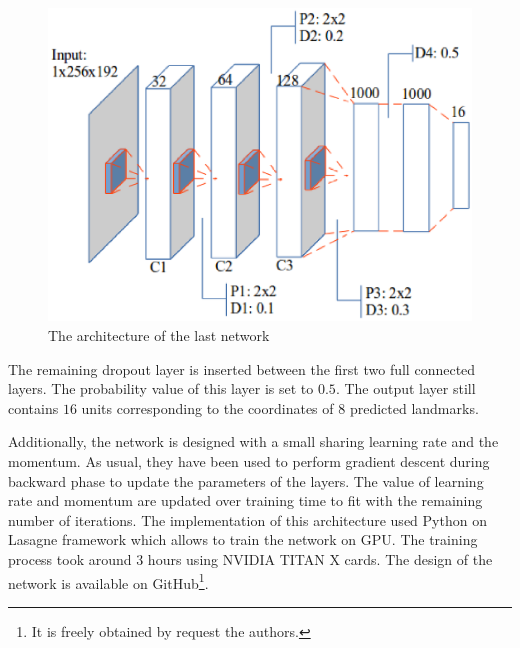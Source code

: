 \documentclass[conference]{IEEEtran}
\begin{document}
\begin{figure}[htbp]
	\centerline{\includegraphics[scale=0.45]{images/architecture3.eps}}
	\caption{The architecture of the last network}
	\label{figarch}
\end{figure}

The remaining dropout layer is inserted between the first two full connected layers. The probability value of this layer is set to $0.5$. The output layer still contains $16$ units corresponding to the coordinates of $8$ predicted landmarks.%

Additionally, the network is designed with a small sharing learning rate and the momentum. As usual, they have been used to perform gradient descent during backward phase to update the parameters of the layers. The value of learning rate and momentum are updated over training time to fit with the remaining number of iterations. The implementation of this architecture used Python on Lasagne framework \cite{lasagne} which allows to train the network on GPU. The training process took around 3 hours using NVIDIA TITAN X cards. The design of the network is available on GitHub\footnote{It is freely obtained by request the authors.}.
\end{document}
